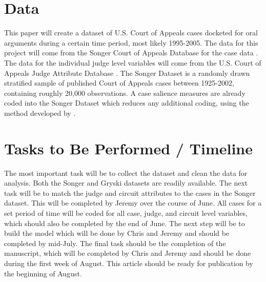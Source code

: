 \documentclass[12pt]{article}
\begin{document}
\section*{Data}
This paper will create a dataset of U.S. Court of Appeals cases docketed for oral arguments during a certain time period, most likely 1995-2005.  The data for this project will come from the Songer Court of Appeals Database for the case data \citep{Songer2007}.  The data for the individual judge level variables will come from the U.S. Court of Appeals Judge Attribute Database \citep{Gryski2008}.  The Songer Dataset is a randomly drawn stratified sample of published Court of Appeals cases between 1925-2002, containing roughly 20,000 observations. A case salience measures are already coded into the Songer Dataset which reduces any additional coding, using the method developed by \citet{Hettinger2003}.

\section*{Tasks to Be Performed / Timeline}
The most important task will be to collect the dataset and clean the data for analysis.  Both the Songer and Gryski datasets are readily available.  The next task will be to match the judge and circuit attributes to the cases in the Songer dataset.  This will be completed by Jeremy over the course of June.  All cases for a set period of time will be coded for all case, judge, and circuit level variables, which should also be completed by the end of June.  The next step will be to build the model which will be done by Chris and Jeremy and should be completed by mid-July.  The final task should be the completion of the manuscript, which will be completed by Chris and Jeremy and should be done during the first week of August.  This article should be ready for publication by the beginning of August.

\singlespacing


\end{document}
